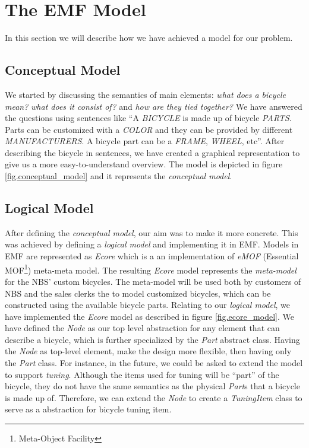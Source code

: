 \section{The EMF Model}
\label{sec.logical_model}
In this section we will describe how we have achieved a model for our problem.

\subsection{Conceptual Model}
\noindent We started by discussing the semantics of main elements: \emph{what
does a bicycle mean?} \emph{what does it consist of?} and \emph{how are they
tied together?} We have answered the questions using sentences like ``A
\emph{BICYCLE} is made up of bicycle \emph{PARTS}. Parts can be customized with
a \emph{COLOR} and they can be provided by different \emph{MANUFACTURERS}.
A bicycle part can be a \emph{FRAME}, \emph{WHEEL}, etc''. After describing the
bicycle in sentences, we have created a graphical representation to give us a
more easy-to-understand overview. The model is depicted in figure
\ref{fig.conceptual_model} and it represents the \emph{conceptual model}.

\subsection{Logical Model}
\noindent After defining the \emph{conceptual model}, our aim was to make it
more concrete. This was achieved by defining a \emph{logical model} and
implementing it in EMF. Models in EMF are represented as \emph{Ecore} which is a
an implementation of \emph{eMOF} (Essential MOF\footnote{Meta-Object Facility})
meta-meta model. The resulting \emph{Ecore} model represents the \emph{meta-model} for
the NBS' custom bicycles. The meta-model will be used both by customers of NBS and the sales
clerks the to model customized bicycles, which can be constructed using the
available bicycle parts. Relating to our \emph{logical model}, we have
implemented the \emph{Ecore} model as described in figure \ref{fig.ecore_model}.
We have defined the \emph{Node} as our top level abstraction for any element
that can describe a bicycle, which is further specialized by the \emph{Part}
abstract class. Having the \emph{Node} as top-level element, make the design
more flexible, then having only the \emph{Part} class. For instance,  in the
future, we could be asked to extend the model to support \emph{tuning}. Although
the items used for tuning will be ``part'' of the bicycle, they do not have the
same semantics as the physical \emph{Part}s that a bicycle is made up of.
Therefore, we can extend the \emph{Node} to create a \emph{TuningItem} class to
serve as a abstraction for bicycle tuning item.\\


